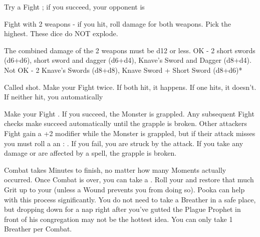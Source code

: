 {  

  Try a Fight \RO; if you succeed, your opponent is 


  Fight with 2 weapons - if you hit, roll damage for both weapons.  Pick the highest. These dice do NOT explode.

  The combined damage of the 2 weapons must be d12 or less.  OK - 2 short swords (d6+d6), short sword and dagger (d6+d4), Knave's Sword and Dagger (d8+d4).  Not OK - 2 Knave's Swords (d8+d8), Knave Sword + Short Sword (d8+d6)*


  Called shot.  Make your Fight \RO twice.  If both hit, it happens.  If one hits, it doesn't.  If neither hit, you automatically 



  Make your Fight \RO.  If you succeed, the Monster is grappled.  Any subsequent Fight checks  make succeed automatically until the grapple is broken.  Other attackers Fight \RO gain a +2 modifier while the Monster is grappled, but if their attack misses you must roll a an \RS : \DEX.  If you fail, you are struck by the attack.  If you take any damage or are affected by a spell, the grapple is broken.





  Combat takes Minutes to finish, no matter how many Moments actually occurred.  Once Combat is over, you can take a .  Roll your \FLESH and restore that much Grit up to your \MAX (unless a Wound prevents you from doing so).  Pooka can help with this process significantly.  You do not need to take a Breather in a safe place, but dropping down for a nap right after you've gutted the Plague Prophet in front of his congregation may not be the hottest idea.  You can only take 1 Breather per Combat.  


}

